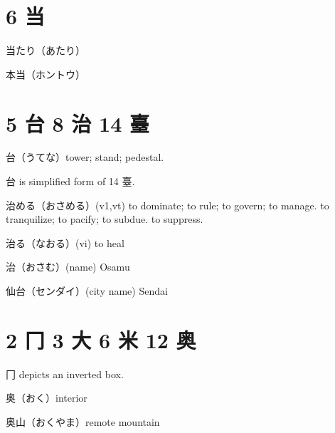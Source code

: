\section{6 当}

当たり（あたり）

本当（ホントウ）

\section{5 台 8 治 14 臺}

台（うてな）tower; stand; pedestal.

台 is simplified form of 14 臺.

治める（おさめる）(v1,vt)
to dominate; to rule; to govern; to manage.
to tranquilize; to pacify; to subdue.
to suppress.

治る（なおる）(vi) to heal

治（おさむ）(name) Osamu

仙台（センダイ）(city name) Sendai

\section{2 冂 3 大 6 米 12 奥}

冂 depicts an inverted box.

奥（おく）interior

奥山（おくやま）remote mountain
